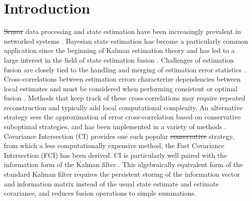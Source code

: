 \documentclass[letterpaper, 10 pt, journal, twoside]{ieeetran}  %
\providecommand{\DIFadd}[1]{{\protect\color{blue}\uwave{#1}}} %
\providecommand{\DIFdel}[1]{{\protect\color{red}\sout{#1}}}                      %
\providecommand{\DIFaddbegin}{} %
\providecommand{\DIFaddend}{} %
\providecommand{\DIFdelbegin}{} %
\providecommand{\DIFdelend}{} %
\begin{document}
\DIFaddbegin \begin{IEEEkeywords}
\DIFadd{Sensor fusion, Estimation, Kalman filtering
}\end{IEEEkeywords}


\DIFaddend %




\section{Introduction}
\DIFdelbegin \DIFdel{Sensor }\DIFdelend \DIFaddbegin {} \DIFaddend data processing and state estimation have been increasingly prevalent in networked systems \cite{ligginsDistributedDataFusion2012}. Bayesian state estimation has become a particularly common application since the beginning of Kalman estimation theory and has led to a large interest in the field of state estimation fusion \cite{willnerKalmanFilterAlgorithms1976,hashemipourDecentralizedStructuresParallel1988,chongFortyYearsDistributed2017}. Challenges of estimation fusion are closely tied to the handling and merging of estimation error statistics \cite{noackTreatmentDependentInformation2017}. Cross-correlations between estimation errors characterize dependencies between local estimates and must be considered when performing consistent or optimal fusion \cite{bar-shalomTracktotrackCorrelationProblem1981,sunMultisensorOptimalInformation2004}. Methods that keep track of these cross-correlations may require repeated reconstruction \cite{steinbringOptimalSamplebasedFusion2016} and typically add local computational complexity. An alternative strategy sees the approximation of error cross-correlation based on conservative suboptimal strategies, and has been implemented in a variety of methods \cite{julierNondivergentEstimationAlgorithm1997,noackDecentralizedDataFusion2017,niehsenInformationFusionBased2002}. Covariance Intersection (CI) \cite{julierNondivergentEstimationAlgorithm1997} provides one such popular \DIFdelbegin \DIFdel{conservative }\DIFdelend strategy, from which a less computationally expensive method, the Fast Covariance Intersection (FCI) \cite{niehsenInformationFusionBased2002} has been derived. CI is particularly well paired with the information form of the Kalman filter \cite{mutambaraDecentralizedEstimationControl1998,pfaffInformationFormDistributed2017}. This algebraically equivalent form of the standard Kalman filter requires the persistent storing of the information vector and information matrix instead of the usual state estimate and estimate covariance, and reduces fusion operations to simple summations. 
\end{document}
